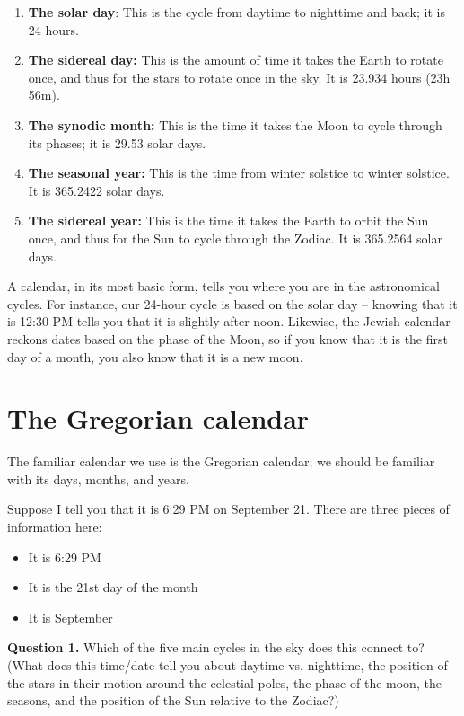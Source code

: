 \documentclass[11pt]{article}
\begin{document}
\begin{enumerate}
	\item {\bf The solar day}: This is the cycle from daytime to nighttime and back; it is 24 hours.
	\item {\bf The sidereal day:} This is the amount of time it takes the Earth to rotate once, and thus for the stars to rotate once in the sky. It is 23.934 hours (23h 56m).
	\item {\bf The synodic month:} This is the time it takes the Moon to cycle through its phases; it is 29.53 solar days.
	\item {\bf The seasonal year:} This is the time from winter solstice to winter solstice. It is 365.2422 solar days.
	\item {\bf The sidereal year:} This is the time it takes the Earth to orbit the Sun once, and thus for the Sun to cycle through the Zodiac. It is 365.2564 solar days.
\end{enumerate}

A calendar, in its most basic form, tells you where you are in the astronomical cycles. For instance, our 24-hour cycle is based on the solar day -- knowing that it is 12:30 PM tells you that it is slightly after noon. Likewise, the Jewish calendar reckons dates based on the phase of the Moon, so if you know that it is the first day of a month, you also know that it is a new moon. 

\section{The Gregorian calendar}

The familiar calendar we use is the Gregorian calendar; we should be familiar with its days, months, and years.

Suppose I tell you that it is 6:29 PM on September 21.  There are three pieces of information here: 

\begin{itemize}
	\item It is 6:29 PM
	\item It is the 21st day of the month
	\item It is September
\end{itemize}

{\bf Question 1.}  Which of the five main cycles in the sky does this connect to? (What does this time/date tell you about daytime vs. nighttime, the position of the stars in their motion around the celestial poles, the phase of the moon, the seasons, and the position of the Sun relative to the Zodiac?) 
\end{document}
